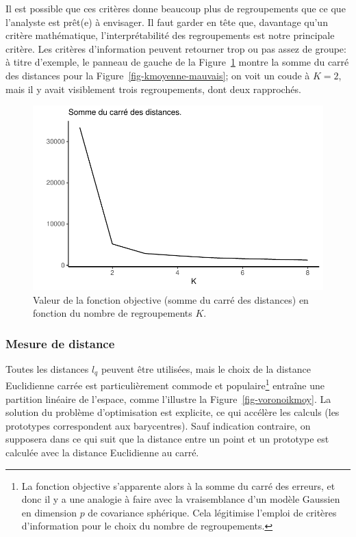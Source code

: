 \documentclass[
  11pt,
  letterpaper,
]{scrbook}
\theoremstyle{definition}
\theoremstyle{remark}
\begin{document}
Il est possible que ces critères donne beaucoup plus de regroupements
que ce que l'analyste est prêt(e) à envisager. Il faut garder en tête
que, davantage qu'un critère mathématique, l'interprétabilité des
regroupements est notre principale critère. Les critères d'information
peuvent retourner trop ou pas assez de groupe: à titre d'exemple, le
panneau de gauche de la Figure~\ref{fig-coudekmoy} montre la somme du
carré des distances pour la Figure~\ref{fig-kmoyenne-mauvais}; on voit
un coude à \(K=2\), mais il y avait visiblement trois regroupements,
dont deux rapprochés.

\begin{figure}[ht!]

{\centering \includegraphics{./03-regroupements_files/figure-pdf/fig-coudekmoy-1.pdf}

}

\caption{\label{fig-coudekmoy}Valeur de la fonction objective (somme du
carré des distances) en fonction du nombre de regroupements \(K\).}

\end{figure}

\hypertarget{mesure-de-distance}{%
\subsubsection*{Mesure de distance}\label{mesure-de-distance}}

Toutes les distances \(l_q\) peuvent être utilisées, mais le choix de la
distance Euclidienne carrée est particulièrement commode et
populaire\footnote{La fonction objective s'apparente alors à la somme du
  carré des erreurs, et donc il y a une analogie à faire avec la
  vraisemblance d'un modèle Gaussien en dimension \(p\) de covariance
  sphérique. Cela légitimise l'emploi de critères d'information pour le
  choix du nombre de regroupements.} entraîne une partition linéaire de
l'espace, comme l'illustre la Figure~\ref{fig-voronoikmoy}. La solution
du problème d'optimisation est explicite, ce qui accélère les calculs
(les prototypes correspondent aux barycentres). Sauf indication
contraire, on supposera dans ce qui suit que la distance entre un point
et un prototype est calculée avec la distance Euclidienne au carré.
\end{document}
